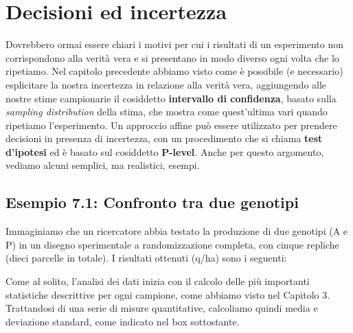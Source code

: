 \documentclass[
  12pt,
]{book}
\begin{document}
\hypertarget{decisioni-ed-incertezza}{%
\chapter{Decisioni ed incertezza}\label{decisioni-ed-incertezza}}

Dovrebbero ormai essere chiari i motivi per cui i risultati di un esperimento non corrispondono alla verità vera e si presentano in modo diverso ogni volta che lo ripetiamo. Nel capitolo precedente abbiamo visto come è possibile (e necessario) esplicitare la nostra incertezza in relazione alla verità vera, aggiungendo alle nostre stime campionarie il cosiddetto \textbf{intervallo di confidenza}, basato sulla \emph{sampling distribution} della stima, che mostra come quest'ultima vari quando ripetiamo l'esperimento. Un approccio affine può essere utilizzato per prendere decisioni in presenza di incertezza, con un procedimento che si chiama \textbf{test d'ipotesi} ed è basato sul cosiddetto \textbf{P-level}. Anche per questo argomento, vediamo alcuni semplici, ma realistici, esempi.

\hypertarget{esempio-7.1-confronto-tra-due-genotipi}{%
\section{Esempio 7.1: Confronto tra due genotipi}\label{esempio-7.1-confronto-tra-due-genotipi}}

Immaginiamo che un ricercatore abbia testato la produzione di due genotipi (A e P) in un disegno sperimentale a randomizzazione completa, con cinque repliche (dieci parcelle in totale). I risultati ottenuti (q/ha) sono i seguenti:

Come al solito, l'analisi dei dati inizia con il calcolo delle più importanti statistiche descrittive per ogni campione, come abbiamo visto nel Capitolo 3. Trattandosi di una serie di misure quantitative, calcoliamo quindi media e deviazione standard, come indicato nel box sottostante.
\end{document}

